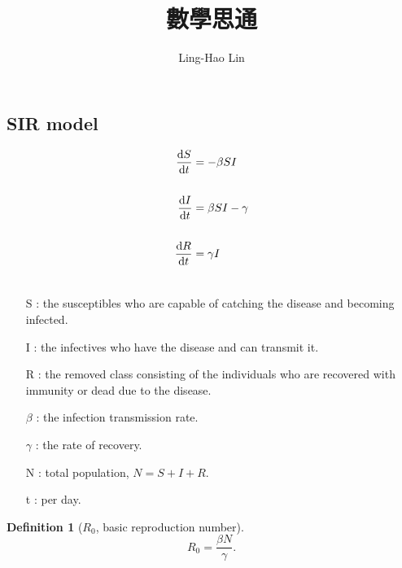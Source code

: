 \documentclass[12pt,a4paper]{article}
\title{數學思通}
\author{Ling-Hao Lin}
\date{}
\newtheorem*{mydef}{Definition}
\begin{document}
\maketitle

\begin{center}
\section*{SIR model}
\end{center}
\begin{align*}
\odv{S}{t}&= -\beta SI \\
\quad\\
\odv{I}{t}&= \beta SI-\gamma\\
\quad\\
\odv{R}{t}&= \gamma I\\
\quad
\end{align*}

\begin{itemize}
\item[S]: the susceptibles who are capable of catching the disease and becoming infected.
\item[I]: the infectives who have the disease and can transmit it.
\item[R]: the removed class consisting of the individuals who are recovered with immunity or dead due to the disease.
\item[$\beta$]: the infection transmission rate.
\item[$\gamma$]: the rate of recovery.
\item[N]: total population, $N=S+I+R$.
\item[t]: per day.
\end{itemize}


\quad
\begin{mydef}[$R_{0}$, basic reproduction number]
\qquad
$$R_{0}=\frac{\beta N}{\gamma}.$$
\qquad

\end{mydef}

\newpage
\end{document}
